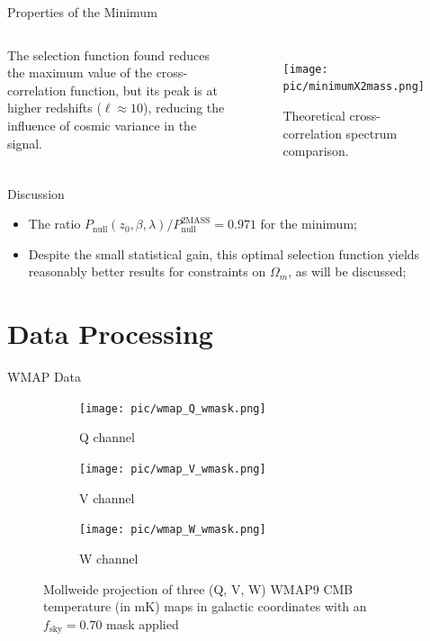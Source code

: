 \documentclass[serif, aspectratio=169]{beamer}
\begin{document}
\begin{frame}{Properties of the Minimum}
    \begin{columns}
        The selection function found reduces the maximum value of the cross-correlation function, but its peak is at higher redshifts ($\ell\approx 10$), reducing the influence of cosmic variance in the signal.
        
        \begin{figure}
            \centering
            \texttt{[image: pic/minimumX2mass.png]}
            \caption{Theoretical cross-correlation spectrum comparison.}
            \label{fig:minimum_cross_corr}
        \end{figure}
    \end{columns}
\end{frame}

\begin{frame}{Discussion}
    \begin{itemize}
        \item The ratio $P_\text{null}(z_0,\beta, \lambda)/P_\text{null}^\text{2MASS}=0.971$ for the minimum;
        \item Despite the small statistical gain, this optimal selection function yields reasonably better results for constraints on $\Omega_m$, as will be discussed;
    \end{itemize}
\end{frame}

\section{Data Processing}

\begin{frame}{WMAP Data}
    \begin{figure}
        \centering
        \begin{subfigure}[b]{0.32\linewidth}
            \texttt{[image: pic/wmap\_Q\_wmask.png]}
            \caption{Q channel}
            \label{fig:wmap_Q}
        \end{subfigure}
        \hfill
        \begin{subfigure}[b]{0.32\linewidth}
            \texttt{[image: pic/wmap\_V\_wmask.png]}
            \caption{V channel}
            \label{fig:wmap_V}
        \end{subfigure}
        \hfill
        \begin{subfigure}[b]{0.32\linewidth}
            \texttt{[image: pic/wmap\_W\_wmask.png]}
            \caption{W channel}
            \label{fig:wmap_W}
        \end{subfigure}
    \caption{Mollweide projection of three (Q, V, W) WMAP9 CMB temperature (in mK) maps in galactic coordinates with an $f_\text{sky}=0.70$ mask applied}
    \label{fig:wmap_maps}
    \end{figure}
\end{frame}
\end{document}
